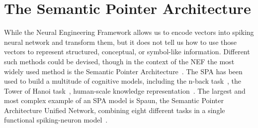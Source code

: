 \chapter{The Semantic Pointer Architecture}\label{sec:spa}
While the Neural Engineering Framework allows us to encode vectors into spiking neural network and transform them, but it does not tell us how to use those vectors to represent structured, conceptual, or symbol-like information.
Different such methods could be devised, though in the context of the NEF the most widely used method is the Semantic Pointer Architecture~\parencite[SPA;][]{eliasmith2013}.
The SPA has been used to build a multitude of cognitive models, including the n-back task~\parencite{gosmann2015}, the Tower of Hanoi task~\parencite{stewart2011-2}, human-scale knowledge representation~\parencite{crawford2013}.
The largest and most complex example of an SPA model is Spaun, the Semantic Pointer Architecture Unified Network, combining eight different tasks in a single functional spiking-neuron model~\parencite{eliasmith2012}.

